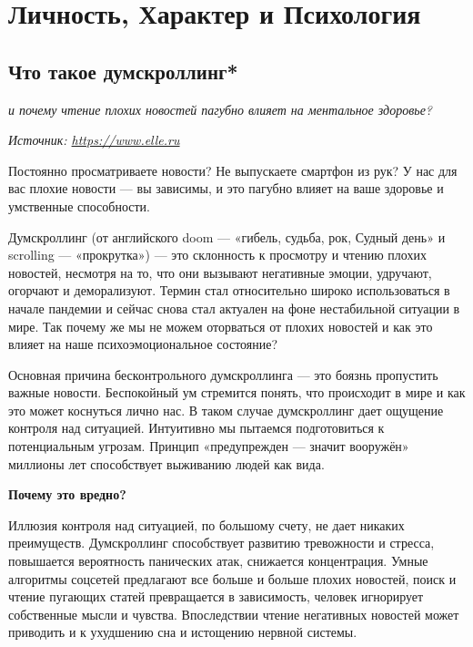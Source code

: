 \chapter{Личность, Характер и Психология}
\section{Что такое думскроллинг*}

\textit{и почему чтение плохих новостей пагубно влияет на ментальное здоровье?}

\textit{Источник: \url{https://www.elle.ru}}

\begin{fancyquotes}
    Постоянно просматриваете новости? Не выпускаете смартфон из рук? У нас для вас плохие новости  ---  вы зависимы, и это пагубно влияет на ваше здоровье и умственные способности.
\end{fancyquotes}

Думскроллинг (от английского doom  ---  «гибель, судьба, рок, Судный день» и scrolling  ---  «прокрутка»)  ---  это склонность к просмотру и чтению плохих новостей, несмотря на то, что они вызывают негативные эмоции, удручают, огорчают и деморализуют. Термин стал относительно широко использоваться в начале пандемии и сейчас снова стал актуален на фоне нестабильной ситуации в мире. Так почему же мы не можем оторваться от плохих новостей и как это влияет на наше психоэмоциональное состояние?

Основная причина бесконтрольного думскроллинга  ---  это боязнь пропустить важные новости. Беспокойный ум стремится понять, что происходит в мире и как это может коснуться лично нас. В таком случае думскроллинг дает ощущение контроля над ситуацией. Интуитивно мы пытаемся подготовиться к потенциальным угрозам. Принцип «предупрежден  ---  значит вооружён» миллионы лет способствует выживанию людей как вида.

\textbf{Почему это вредно?}

Иллюзия контроля над ситуацией, по большому счету, не дает никаких преимуществ. Думскроллинг способствует развитию тревожности и стресса, повышается вероятность панических атак, снижается концентрация. Умные алгоритмы соцсетей предлагают все больше и больше плохих новостей, поиск и чтение пугающих статей превращается в зависимость, человек игнорирует собственные мысли и чувства. Впоследствии чтение негативных новостей может приводить и к ухудшению сна и истощению нервной системы.

